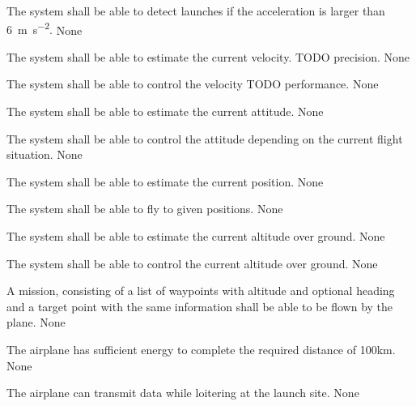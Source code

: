 
{
			The system shall be able to detect launches if the acceleration is larger than \SI{6}{\meter \per \second^2}.
		}
{ }
{None}

{The system shall be able to estimate the current velocity. TODO precision.}
{    }
{None}

{The system shall be able to control the velocity TODO performance.}
{    }
{None}

{The system shall be able to estimate the current attitude.}
{    }
{None}

{
			The system shall be able to control the attitude depending on the current flight situation.
		}
{    }
{None}

{The system shall be able to estimate the current position.}
{   }
{None}

{The system shall be able to fly to given positions.}
{   }
{None}

{The system shall be able to estimate the current altitude over ground.}
{   }
{None}

{The system shall be able to control the current altitude over ground.}
{   }
{None}

{
			A mission, consisting of a list of waypoints with altitude and optional heading and a target point with the same 
			information shall be able to be flown by the plane.
		}
{  }
{None}

{The airplane has sufficient energy to complete the required distance of 100km.}
{ }
{None}

{The airplane can transmit data while loitering at the launch site.}
{ }
{None}


